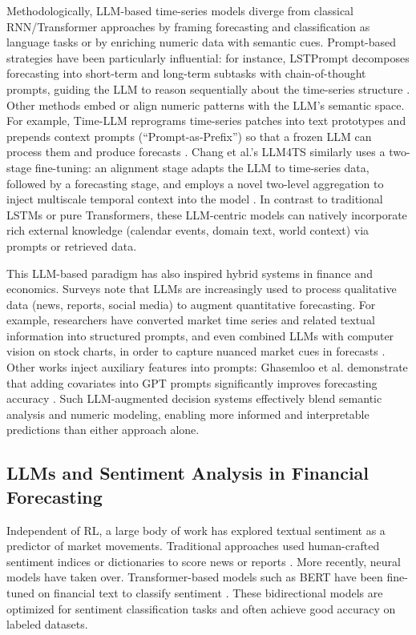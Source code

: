 Methodologically, \gls{LLM}-based time-series models diverge from classical RNN/Transformer approaches by framing forecasting and classification as language tasks or by enriching numeric data with semantic cues. Prompt-based strategies have been particularly influential: for instance, LSTPrompt decomposes forecasting into short-term and long-term subtasks with chain-of-thought prompts, guiding the \gls{LLM} to reason sequentially about the time-series structure \cite{LiuZhao2024}. Other methods embed or align numeric patterns with the \gls{LLM}’s semantic space. For example, Time-LLM reprograms time-series patches into text prototypes and prepends context prompts (“Prompt-as-Prefix”) so that a frozen \gls{LLM} can process them and produce forecasts \cite{Jin2024}. Chang et al.’s LLM4TS similarly uses a two-stage fine-tuning: an alignment stage adapts the \gls{LLM} to time-series data, followed by a forecasting stage, and employs a novel two-level aggregation to inject multiscale temporal context into the model \cite{Chang2025}. In contrast to traditional LSTMs or pure Transformers, these \gls{LLM}-centric models can natively incorporate rich external knowledge (calendar events, domain text, world context) via prompts or retrieved data.

This \gls{LLM}-based paradigm has also inspired hybrid systems in finance and economics. Surveys note that \gls{LLM}s are increasingly used to process qualitative data (news, reports, social media) to augment quantitative forecasting. For example, researchers have converted market time series and related textual information into structured prompts, and even combined \gls{LLM}s with computer vision on stock charts, in order to capture nuanced market cues in forecasts \cite{Zhao2024}. Other works inject auxiliary features into prompts: Ghasemloo et al. demonstrate that adding covariates into GPT prompts significantly improves forecasting accuracy \cite{Ghasemloo2025}. Such \gls{LLM}-augmented decision systems effectively blend semantic analysis and numeric modeling, enabling more informed and interpretable predictions than either approach alone.

\subsection{LLMs and Sentiment Analysis in Financial Forecasting}
Independent of \gls{RL}, a large body of work has explored textual sentiment as a predictor of market movements. Traditional approaches used human-crafted sentiment indices or dictionaries  to score news or reports \cite{Loughran2011}. More recently, neural models have taken over. Transformer-based models such as \gls{BERT} have been fine-tuned on financial text to classify sentiment \cite{Kirtac2024, Fatouros2023}. These bidirectional models are optimized for sentiment classification tasks and often achieve good accuracy on labeled datasets.

